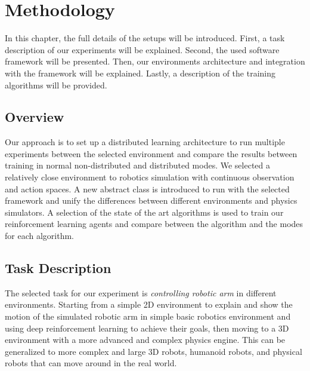 
\chapter{Methodology}\label{chapter:methodology}

In this chapter, the full details of the setups will be introduced. First, a task description of our experiments will be explained. Second, the used software framework will be presented. Then, our environments architecture and integration with the framework will be explained. Lastly, a description of the training algorithms will be provided.

\section{Overview}

Our approach is to set up a distributed learning architecture to run multiple experiments between the selected environment and compare the results between training in normal non-distributed and distributed modes. We selected a relatively close environment to robotics simulation with continuous observation and action spaces. A new abstract class is introduced to run with the selected framework and unify the differences between different environments and physics simulators. A selection of the state of the art algorithms is used to train our reinforcement learning agents and compare between the algorithm and the modes for each algorithm.

\section{Task Description}

The selected task for our experiment is \textit{controlling robotic arm} in different environments. Starting from a simple 2D environment to explain and show the motion of the simulated robotic arm in simple basic robotics environment and using deep reinforcement learning to achieve their goals, then moving to a 3D environment with a more advanced and complex physics engine. This can be generalized to more complex and large 3D robots, humanoid robots, and physical robots that can move around in the real world.

